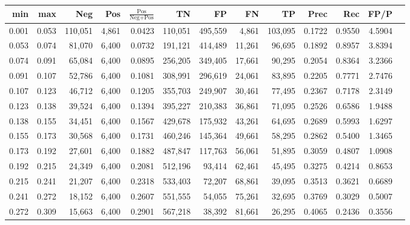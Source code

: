 \begin{tabular}{rrrrrrrrrrrrr}
\toprule
  min &   max &     Neg &   Pos & $\frac{\text{Pos}}{\text{Neg}+\text{Pos}}$ &      TN &      FP &      FN &      TP &   Prec &    Rec &   FP/P \\
\midrule
0.001 & 0.053 & 110,051 & 4,861 &                                     0.0423 & 110,051 & 495,559 &   4,861 & 103,095 & 0.1722 & 0.9550 & 4.5904 \\
0.053 & 0.074 &  81,070 & 6,400 &                                     0.0732 & 191,121 & 414,489 &  11,261 &  96,695 & 0.1892 & 0.8957 & 3.8394 \\
0.074 & 0.091 &  65,084 & 6,400 &                                     0.0895 & 256,205 & 349,405 &  17,661 &  90,295 & 0.2054 & 0.8364 & 3.2366 \\
0.091 & 0.107 &  52,786 & 6,400 &                                     0.1081 & 308,991 & 296,619 &  24,061 &  83,895 & 0.2205 & 0.7771 & 2.7476 \\
0.107 & 0.123 &  46,712 & 6,400 &                                     0.1205 & 355,703 & 249,907 &  30,461 &  77,495 & 0.2367 & 0.7178 & 2.3149 \\
0.123 & 0.138 &  39,524 & 6,400 &                                     0.1394 & 395,227 & 210,383 &  36,861 &  71,095 & 0.2526 & 0.6586 & 1.9488 \\
0.138 & 0.155 &  34,451 & 6,400 &                                     0.1567 & 429,678 & 175,932 &  43,261 &  64,695 & 0.2689 & 0.5993 & 1.6297 \\
0.155 & 0.173 &  30,568 & 6,400 &                                     0.1731 & 460,246 & 145,364 &  49,661 &  58,295 & 0.2862 & 0.5400 & 1.3465 \\
0.173 & 0.192 &  27,601 & 6,400 &                                     0.1882 & 487,847 & 117,763 &  56,061 &  51,895 & 0.3059 & 0.4807 & 1.0908 \\
0.192 & 0.215 &  24,349 & 6,400 &                                     0.2081 & 512,196 &  93,414 &  62,461 &  45,495 & 0.3275 & 0.4214 & 0.8653 \\
0.215 & 0.241 &  21,207 & 6,400 &                                     0.2318 & 533,403 &  72,207 &  68,861 &  39,095 & 0.3513 & 0.3621 & 0.6689 \\
0.241 & 0.272 &  18,152 & 6,400 &                                     0.2607 & 551,555 &  54,055 &  75,261 &  32,695 & 0.3769 & 0.3029 & 0.5007 \\
0.272 & 0.309 &  15,663 & 6,400 &                                     0.2901 & 567,218 &  38,392 &  81,661 &  26,295 & 0.4065 & 0.2436 & 0.3556 \\

\end{tabular}
